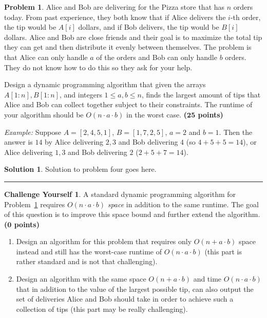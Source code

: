 \documentclass{article}
\theoremstyle{definition}
\newtheorem{problem}{Problem}
\newtheorem*{challenge}{Challenge Yourself}
\def\fline{\rule{0.75\linewidth}{0.5pt}}
\newcommand{\finishline}{\vspace{-15pt}\begin{center}\fline\end{center}}
\newtheorem*{solution*}{Solution}
\newenvironment{solution}{\begin{solution*}}{{\finishline} \end{solution*}}
\newcommand{\grade}[1]{\hfill{\textbf{($\mathbf{#1}$ points)}}}
\begin{document}
\begin{problem}\label{DP}
	Alice and Bob are delivering for the Pizza store that has $n$ orders today. From past experience, they both know that if Alice delivers the $i$-th order, the tip would be $A[i]$ dollars,
	and if Bob delivers, the tip would be $B[i]$ dollars. Alice and Bob are close friends and their goal is to maximize the total tip they can get and then distribute it evenly between themselves. The problem is that 
	Alice can only handle $a$ of the orders and Bob can only handle $b$ orders. They do not know how to do this so they ask for your help. 
	
	Design a dynamic programming algorithm that given the arrays $A[1:n],B[1:n]$, and integers $1 \leq a,b \leq n$, finds the largest amount of tips that Alice and Bob can collect together subject to their constraints. The 
	runtime of your algorithm should be $O(n \cdot a \cdot b)$ in the worst case. \grade{25}
	
	\emph{Example:} Suppose $A = [2,4,5,1]$, $B=[1,7,2,5]$, $a=2$ and $b=1$. Then the answer is $14$ by Alice delivering $2,3$ and Bob delivering $4$ (so $4+5+5 = 14$), or Alice delivering $1,3$ and Bob delivering $2$ ($2+5+7=14$).  
\end{problem}

\smallskip

\begin{solution}
	Solution to problem four goes here. 
\end{solution}

\smallskip



\begin{challenge}
	A standard dynamic programming algorithm for Problem~\ref{DP} requires $O(n \cdot a \cdot b)$ \emph{space} in addition to the same runtime. The goal of this question is to improve
	this space bound and further extend the algorithm.  \grade{0}
	\begin{enumerate}[label=(\alph*)]
	\item Design an algorithm for this problem that requires only $O(n+a \cdot b)$ space instead and still has the worst-case runtime of $O(n \cdot a \cdot b)$ (this part is rather standard and is not that challenging). 
	\item Design an algorithm with the same space $O(n+a \cdot b)$ and time $O(n \cdot a \cdot b)$ that in addition to the value of the largest possible tip, can also output the set of deliveries Alice and Bob should take
	in order to achieve such a collection of tips (this part may be really challenging).
	\end{enumerate}
	
\end{challenge}
\end{document}

